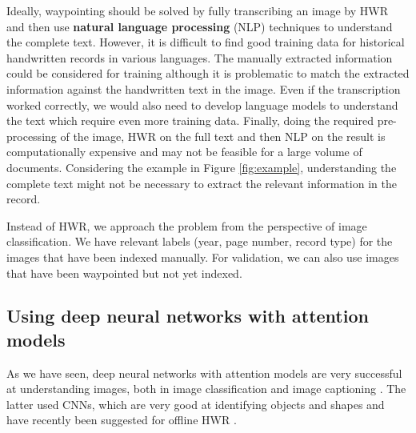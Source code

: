 

Ideally, waypointing should be solved by fully transcribing an image by HWR and then use \textbf{natural language processing} (NLP) techniques to understand the complete text. However, it is difficult to find good training data for historical handwritten records in various languages. The manually extracted information could be considered for training although it is problematic to match the extracted information against the handwritten text in the image. Even if the transcription worked correctly, we would also need to develop language models to understand the text which require even more training data. Finally, doing the required pre-processing of the image, HWR on the full text and then NLP on the result is computationally expensive and may not be feasible for a large volume of documents. Considering the example in Figure \ref{fig:example}, understanding the complete text might not be necessary to extract the relevant information in the record.


Instead of HWR, we approach the problem from the perspective of image classification. We have relevant labels (year, page number, record type) for the images that have been indexed manually. For validation, we can also use images that have been waypointed but not yet indexed.

\subsection{Using deep neural networks with attention models}

As we have seen, deep neural networks with attention models are very successful at understanding images, both in image classification \cite{DeepMindAttention} and image captioning \cite{AttendAndTell}. The latter used CNNs, which are very good at identifying objects and shapes and have recently been suggested for offline HWR \cite{offline_HWR_CNN}.

